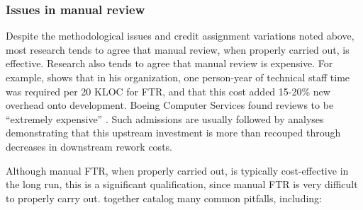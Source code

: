 \subsubsection{Issues in manual review}
\label{sec:issues-manual-review}

Despite the methodological issues and credit assignment variations noted
above, most research tends to agree that manual review, when properly
carried out, is effective.  Research also tends to agree that manual review
is expensive.  For example, \cite{Russell91} shows that in his
organization, one person-year of technical staff time was required per 20
KLOC for FTR, and that this cost added 15-20\% new overhead onto
development. Boeing Computer Services found reviews to be ``extremely
expensive'' \cite{Glass82}. Such admissions are usually followed by
analyses demonstrating that this upstream investment is more than recouped
through decreases in downstream rework costs.

Although manual FTR, when properly carried out, is typically cost-effective
in the long run, this is a significant qualification, since manual FTR is
very difficult to properly carry out. \cite{Deimel91,Freedman90,Gilb88}
together catalog many common pitfalls,  including:

